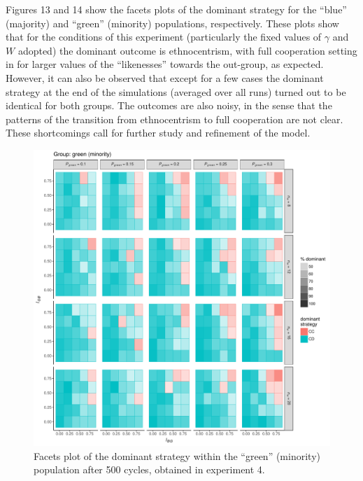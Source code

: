 Figures 13 and 14 show the facets plots of the dominant strategy for the ``blue'' (majority) and ``green'' (minority) populations, respectively. These plots show that for the conditions of this experiment (particularly the fixed values of $ \gamma $ and $ W $ adopted) the dominant outcome is ethnocentrism, with full cooperation setting in for larger values of the ``likenesses'' towards the out-group, as expected. However, it can also be observed that except for a few cases the dominant strategy at the end of the simulations (averaged over all runs) turned out to be identical for both groups. The outcomes are also noisy, in the sense that the patterns of the transition from ethnocentrism to full cooperation are not clear. These shortcomings call for further study and refinement of the model. 
\begin{figure}[t!]
	\label{fig:strategyImmigrantExperiment4}
	\begin{minipage}[c]{0.2\linewidth}
		\caption{Facets plot of the dominant strategy within the ``green'' (minority) population after 500 cycles, obtained in experiment 4.}
	\end{minipage}
	\begin{minipage}[c]{0.75\linewidth}
		\includegraphics[trim={0cm 0cm 0.4cm 0cm}, clip, width=\linewidth]{figures/strategyImmigrantExperiment4.pdf}
	\end{minipage}
\end{figure}

